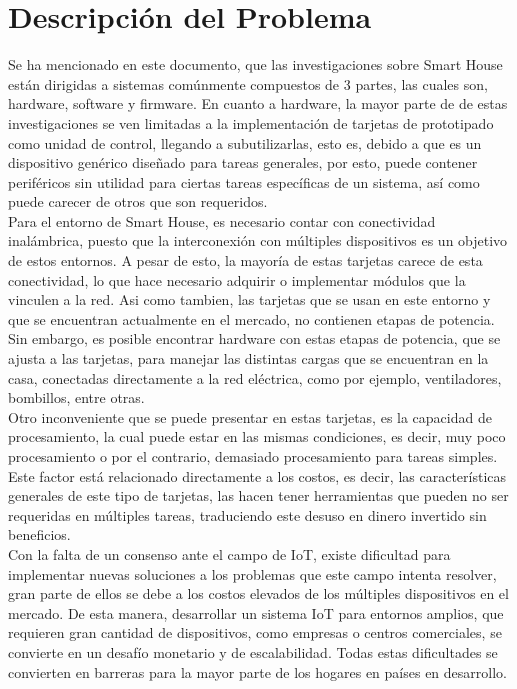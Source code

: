 \chapter{Descripción del Problema}

Se ha mencionado en este documento, que las investigaciones sobre Smart House están dirigidas a sistemas comúnmente compuestos de 3 partes, las cuales son, hardware, software y firmware. En cuanto a hardware, la mayor parte de de estas investigaciones se ven limitadas a la implementación de tarjetas de prototipado como unidad de control, llegando a subutilizarlas, esto es, debido a que es un dispositivo genérico diseñado para tareas generales, por esto, puede contener periféricos sin utilidad para ciertas tareas específicas de un sistema, así como puede carecer de otros que son requeridos.\\

Para el entorno de Smart House, es necesario contar con conectividad inalámbrica, puesto que la interconexión con múltiples dispositivos es un objetivo de estos entornos. A pesar de esto, la mayoría de estas tarjetas carece de esta conectividad, lo que hace necesario adquirir o implementar módulos que la vinculen a la red. Asi como tambien, las tarjetas que se usan en este entorno y que se encuentran actualmente en el mercado, no contienen etapas de potencia. Sin embargo, es posible encontrar hardware con estas etapas de potencia, que se ajusta a las tarjetas, para manejar las distintas cargas que se encuentran en la casa, conectadas directamente a la red eléctrica, como por ejemplo, ventiladores, bombillos, entre otras.\\

Otro inconveniente que se puede presentar en estas tarjetas, es la capacidad de procesamiento, la cual puede estar en las mismas condiciones, es decir, muy poco procesamiento o por el contrario, demasiado procesamiento para tareas simples. Este factor está relacionado directamente a los costos, es decir, las características generales de este tipo de tarjetas, las hacen tener herramientas que pueden no ser requeridas en múltiples tareas, traduciendo este desuso en dinero invertido sin beneficios.\\

Con la falta de un consenso ante el campo de IoT, existe dificultad para implementar nuevas soluciones a los problemas que este campo intenta resolver, gran parte de ellos se debe a los costos elevados de los múltiples dispositivos en el mercado. De esta manera, desarrollar un sistema IoT para entornos amplios, que requieren gran cantidad de dispositivos, como empresas o centros comerciales, se convierte en un desafío monetario y de escalabilidad. Todas estas dificultades se convierten en barreras para la mayor parte de los hogares en países en desarrollo.\\

